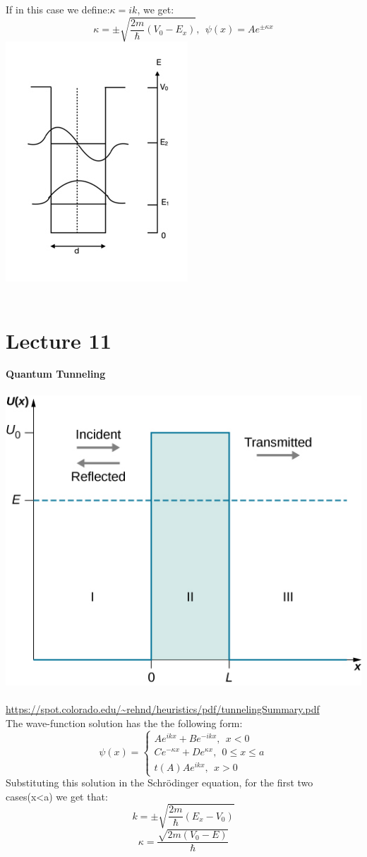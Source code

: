 \documentclass{article}
\begin{document}
If in this case we define:$\kappa = ik$, we get:
$$\kappa = \pm \sqrt{\frac{2m}{\hslash}(V_0-E_x)}, \  \ \psi(x) = Ae^{\pm \kappa x}$$
\includegraphics[scale = 0.4]{QW.jpg} \\ \\ 

\section{ Lecture 11}

\textbf{Quantum Tunneling} \\ \\
\includegraphics[]{QuantumTunneling.jpg} \\ \\ 
\url{https://spot.colorado.edu/~rehnd/heuristics/pdf/tunnelingSummary.pdf} \\
The wave-function solution has the the following form:
$$\psi(x) = \begin{cases}
    Ae^{ikx} + B e^{-ikx}, \ \ x<0 \\
    Ce^{-\kappa x}+De^{\kappa x}, \ \ 0 \leq x \leq a \\
    t(A)Ae^{ikx}, \ \ x>0
\end{cases}
$$
Substituting this solution in the Schrödinger equation, for the first two cases(x<a) we get that:
$$ k = \pm \sqrt{\frac{2m}{\hslash}(E_x-V_0)}$$
$$ \kappa = \frac{\sqrt{2m(V_0-E)}}{\hslash} $$
\end{document}
